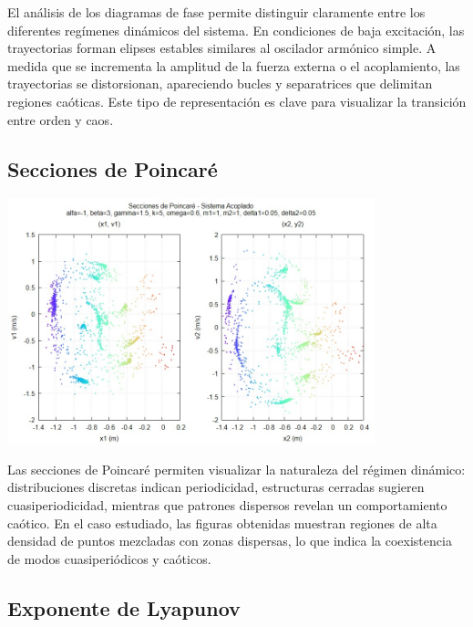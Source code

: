 \documentclass[12pt,a4paper]{article}
\begin{document}
El análisis de los diagramas de fase permite distinguir claramente entre los diferentes regímenes dinámicos del sistema. En condiciones de baja excitación, las trayectorias forman elipses estables similares al oscilador armónico simple. A medida que se incrementa la amplitud de la fuerza externa o el acoplamiento, las trayectorias se distorsionan, apareciendo bucles y separatrices que delimitan regiones caóticas. Este tipo de representación es clave para visualizar la transición entre orden y caos.

\subsection{Secciones de Poincaré}

\vspace{1em}
\begin{center}
\includegraphics[width=0.8\textwidth]{figs/poincare_placeholder.png}
\end{center}
\vspace{1em}

Las secciones de Poincaré permiten visualizar la naturaleza del régimen dinámico: distribuciones discretas indican periodicidad, estructuras cerradas sugieren cuasiperiodicidad, mientras que patrones dispersos revelan un comportamiento caótico. En el caso estudiado, las figuras obtenidas muestran regiones de alta densidad de puntos mezcladas con zonas dispersas, lo que indica la coexistencia de modos cuasiperiódicos y caóticos.

\subsection{Exponente de Lyapunov}
\end{document}
